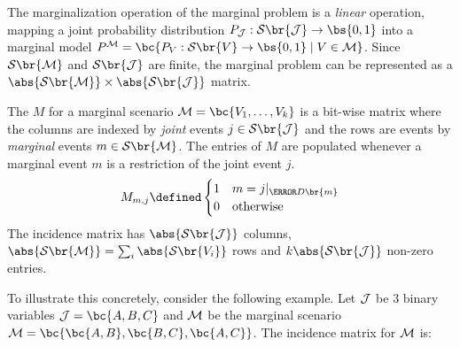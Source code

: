 \documentclass[aps, 10pt, english, twoside, pra, nofootinbib, tightenlines, longbibliography, superscriptaddress]{revtex4-1}
\renewcommand{\Events}[1]{\mathcal{S}\br{#1}} %
\begin{document}
    The marginalization operation of the marginal problem is a \textit{linear} operation, mapping a joint probability distribution $\prob[\jointvar] : \Events{\jointvar} \to \bs{0,1}$ into a marginal model $\prob^{\mscenario} = \bc{\prob[V] : \Events{V} \to \bs{0,1} \mid V \in \mscenario}$. Since $\Events{\mscenario}$ and $\Events{\jointvar}$ are finite, the marginal problem can be represented as a $\abs{\Events{\mscenario}} \times \abs{\Events{\jointvar}}$ matrix.

    \begin{definition}
        \label{def:incidence_matrix}
        The  $M$ for a marginal scenario $\mscenario = \bc{V_1, \dots, V_k}$ is a bit-wise matrix where the columns are indexed by \textit{joint} events $j \in \Events{\jointvar}$ and the rows are events by \textit{marginal} events $m \in \Events{\mscenario}$. The entries of $M$ are populated whenever a marginal event $m$ is a restriction of the joint event $j$.
        \[ M_{m,j} \defined \begin{cases}
            1 & m = j|_{\s{D}\br{m}} \\
            0 & \text{otherwise}
        \end{cases} \]
        The incidence matrix has $\abs{\Events{\jointvar}}$ columns, $\abs{\Events{\mscenario}} = \sum_{i} \abs{\Events{V_i}}$ rows and $k\abs{\Events{\jointvar}}$ non-zero entries.
    \end{definition}
    To illustrate this concretely, consider the following example. Let $\mathcal{J}$ be $3$ binary variables $\jointvar = \bc{A,B,C}$ and $\mathcal{M}$ be the marginal scenario $\mscenario = \bc{\bc{A,B}, \bc{B,C}, \bc{A,C}}$. The incidence matrix for $\mathcal{M}$ is:
\end{document}
